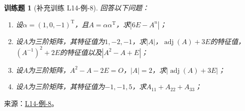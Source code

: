 \documentclass[UTF8,12pt,a4paper,fontset=fandol]{ctexart}
\newtheorem{exercise}{训练题}[section]
\begin{document}
\begin{exercise}[补充训练 L14-例-8]\label{prob:L14-例-8}
回答以下问题：
    \begin{enumerate}
        \item 设$\alpha=(1,0,-1)^\mathrm{T}$，且$A=\alpha\alpha^\mathrm{T}$，求$|6E-A^n|$；

        \item 设$A$为三阶矩阵，其特征值为$1,-2,-1$，求$|A|$，$\operatorname{adj}(A)+3E$的特征值，$(A^{-1})^2+2E$的特征值以及$|A^2-A+E|$；

        \item 设$A$为三阶矩阵，$A^2-A-2E=O$，$|A|=2$，求$|\operatorname{adj}(A)+3E|$；

        \item 设$A$为三阶矩阵，其特征值为$-1,-1,5$，求$A_{11}+A_{22}+A_{33}$；
    \end{enumerate}
\end{exercise}
\noindent 来源：\href{https://github.com/yhwu-is/Linear-Algebra-Left-Undone/blob/new/%E8%AE%B2%E4%B9%89/%E4%B8%93%E9%A2%98/14%20%E7%9B%B8%E4%BC%BC%E6%A0%87%E5%87%86%E5%BD%A2%EF%BC%9A%E5%8A%A8%E6%9C%BA%E4%B8%8E%E5%9F%BA%E7%A1%80.tex}{L14-例-8}。
\end{document}
